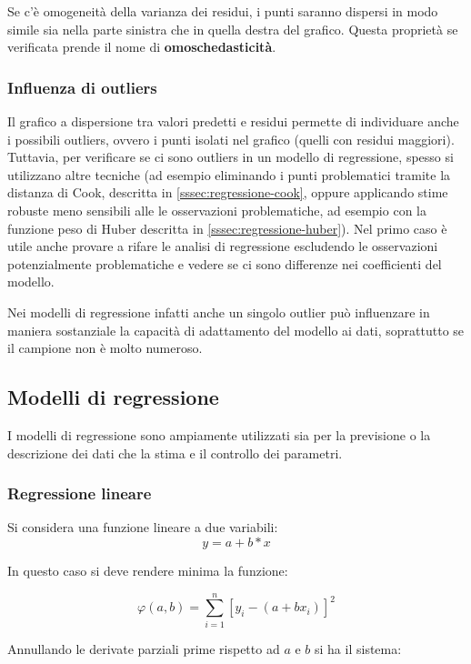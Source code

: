 Se c’è omogeneità della varianza dei residui, i punti saranno dispersi in modo simile sia nella parte sinistra che in quella destra del grafico. Questa proprietà se verificata prende il nome di \textbf{omoschedasticità}.

\subsubsection{Influenza di outliers}\label{ssec:influenza-outliers}
Il grafico a dispersione tra valori predetti e residui permette di individuare anche i possibili outliers, ovvero i punti isolati nel grafico (quelli con residui maggiori).
Tuttavia, per verificare se ci sono outliers in un modello di regressione, spesso si utilizzano altre tecniche (ad esempio eliminando i punti problematici tramite la distanza di Cook, descritta in \ref{sssec:regressione-cook}, oppure applicando stime robuste meno sensibili alle le osservazioni problematiche, ad esempio con la funzione peso di Huber  descritta in \ref{sssec:regressione-huber}). Nel primo caso è utile anche provare a rifare le analisi di regressione escludendo le osservazioni potenzialmente problematiche e vedere se ci sono differenze nei coefficienti del modello.

Nei modelli di regressione infatti anche un singolo outlier può influenzare in maniera sostanziale la capacità di adattamento del modello ai dati, soprattutto se il campione non è molto numeroso.

\subsection{Modelli di regressione}\label{ssec:regressione-modelli}
I modelli di regressione sono ampiamente utilizzati sia per la previsione o la descrizione dei dati che la stima e il controllo dei parametri.

\subsubsection{Regressione lineare}\label{sssec:regressione-lineare}
Si considera una funzione lineare a due variabili:
$$y = a + b*x$$

In questo caso si deve rendere minima la funzione:

$$\varphi(a, b)=\sum_{i=1}^{n}\left[y_{i}-\left(a+b x_{i}\right)\right]^{2}$$\smallskip

Annullando le derivate parziali prime rispetto ad $a$ e $b$ si ha il sistema:

